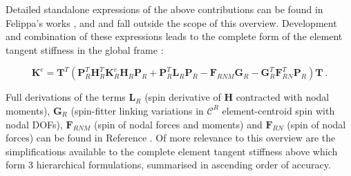  Detailed standalone expressions of the above contributions can be found in Felippa's works \cite{felippa2005unified}, \cite{felippa2000systematic} and \cite{FelippaCR1_2016} and fall outside the scope of this overview. Development and combination of these expressions leads to the complete form of the element tangent stiffness in the global frame \cite{felippa2005unified}:
 
\begin{equation} 
\mathbf{K}^e 
 =
 \mathbf{T}^T
 (
 \mathbf{P}_R^T
 \mathbf{H}_R^T
 \mathbf{K}_R^e
  \mathbf{H}_R
   \mathbf{P}_R
+
 \mathbf{P}_R^T
  \mathbf{L}_R
\mathbf{P}_R
-
\mathbf{F}_{RNM}
 \mathbf{G}_R
 -
  \mathbf{G}_R^T
  \mathbf{F}_{RN}^T
\mathbf{P}_R
 )
\mathbf{T}
 \label{eq_cr14}\ .
 \end{equation}
 
 Full derivations of the terms $\mathbf{L}_R$ (spin derivative of $\mathbf{H}$ contracted with nodal moments), $\mathbf{G}_R$ (spin-fitter linking variations in $\mathscr{C}^R$ element-centroid spin with nodal DOFs), $\mathbf{F}_{RNM}$ (spin of nodal forces and moments) and $\mathbf{F}_{RN}$ (spin of nodal forces) can be found in Reference \cite{felippa2005unified}. Of more relevance to this overview are the simplifications available to the complete element tangent stiffness above which form 3 hierarchical formulations, summarised in ascending order of accuracy.
 
